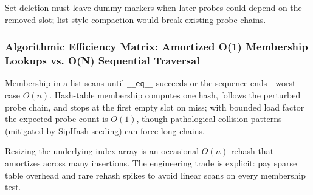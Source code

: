 Set deletion must leave dummy markers when later probes could depend on the removed slot; list-style compaction would break existing probe chains.

\subsubsection{Algorithmic Efficiency Matrix: Amortized O(1) Membership Lookups vs. O(N) Sequential Traversal}

Membership in a list scans until \texttt{\_\_eq\_\_} succeeds or the sequence ends---worst case $O(n)$. Hash-table membership computes one hash, follows the perturbed probe chain, and stops at the first empty slot on miss; with bounded load factor the expected probe count is $O(1)$, though pathological collision patterns (mitigated by SipHash seeding) can force long chains.

Resizing the underlying index array is an occasional $O(n)$ rehash that amortizes across many insertions. The engineering trade is explicit: pay sparse table overhead and rare rehash spikes to avoid linear scans on every membership test.
